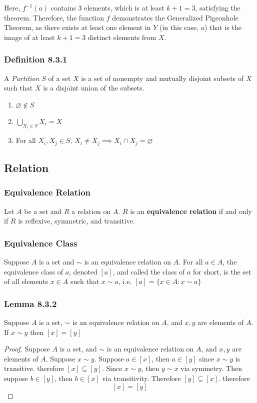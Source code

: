 \documentclass[12pt]{book}
\begin{document}
Here, \( f^{-1}(a) \) contains 3 elements, which is at least \( k + 1 = 3 \), satisfying the theorem. Therefore, the function \( f \) demonstrates the Generalized Pigeonhole Theorem, as there exists at least one element in \( Y \) (in this case, \( a \)) that is the image of at least \( k + 1 = 3 \) distinct elements from \( X \).
\subsubsection{Definition 8.3.1}
A \textit{Partition} $S$ of a set $X$ is a set of nonempty and mutually disjoint subsets of $X$ such that $X$ is a disjoint union of the subsets.
\begin{enumerate}
    \item $\varnothing \notin S$
    \item $\bigcup_{X_i \in S}^{}X_i = X$
    \item For all $X_i,X_j \in S$, $X_i \neq X_j \implies X_i \cap X_j = \varnothing$
\end{enumerate}

\subsection{Relation}


\subsubsection{Equivalence Relation}
Let $A$ be a set and $R$ a relation on $A$. $R$ is an \textbf{equivalence relation} if and only if $R$ is reflexive, symmetric, and transitive. 

\subsubsection{Equivalence Class}
Suppose $A$ is a set and $\sim$ is an equivalence relation on $A$. For all $a \in A$, the equivalence class of $a$, denoted $[a]$, and called the class of $a$ for short, is the set of all elements $x \in A$ such that $x \sim a$, i.e. $[a] = \{ x\in A \colon x \sim a\}$

\subsubsection{Lemma 8.3.2}
Suppose $A$ is a set, $\sim$ is an equivalence relation on $A$, and $x,y$ are elements of $A$. If $x \sim y$ then $[x] = [y]$
\begin{proof}
    Suppose $A$ is a set, and $\sim$ is an equivalence relation on $A$, and $x,y$ are elements of $A$. Suppose $x \sim y$. Suppose $a\in[x]$, then $a \in [y]$ since $x \sim y$ is transitive. therefore $[x] \subseteq [y]$. 
    Since $x \sim y$, then $y \sim x$ via symmetry. Then suppose $b \in [y]$, then $b\in [x]$ via transitivity. Therefore $[y] \subseteq [x]$. therefore 
    \[
    [x]=[y]
    \]
\end{proof}
\end{document}
